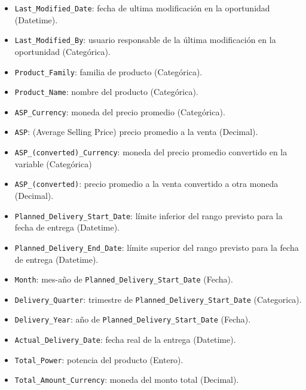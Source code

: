\documentclass[titlepage,a4paper]{article}
\begin{document}
\begin{itemize}
    \item \verb|Last_Modified_Date|: fecha de ultima modificación en la oportunidad (Datetime).

    \item \verb|Last_Modified_By|: usuario responsable de la última modificación en la oportunidad (Categórica).

    \item \verb|Product_Family|: familia de producto (Categórica).

    \item \verb|Product_Name|: nombre del producto (Categórica).

    \item \verb|ASP_Currency|: moneda del precio promedio (Categórica).

    \item \verb|ASP|: (Average Selling Price) precio promedio a la venta (Decimal).

    \item \verb|ASP_(converted)_Currency|: moneda del precio promedio convertido en la variable (Categórica)

    \item \verb|ASP_(converted)|: precio promedio a la venta convertido a otra moneda (Decimal).

    \item \verb|Planned_Delivery_Start_Date|: límite inferior del rango previsto para la fecha de entrega (Datetime).

    \item \verb|Planned_Delivery_End_Date|: límite superior del rango previsto para la fecha de entrega (Datetime).

    \item \verb|Month|: mes-año de \verb|Planned_Delivery_Start_Date| (Fecha).

    \item \verb|Delivery_Quarter|: trimestre de \verb|Planned_Delivery_Start_Date| (Categorica).

    \item \verb|Delivery_Year|: año de \verb|Planned_Delivery_Start_Date| (Fecha).

    \item \verb|Actual_Delivery_Date|: fecha real de la entrega (Datetime).

    \item \verb|Total_Power|: potencia del producto (Entero).

    \item \verb|Total_Amount_Currency|: moneda del monto total (Decimal).


\end{itemize}
\end{document}
